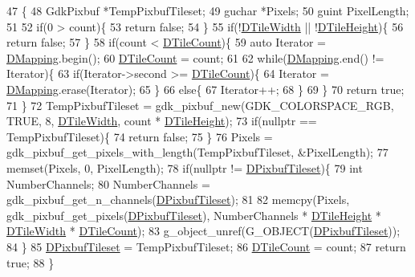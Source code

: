 \begin{DoxyCode}
47                                        \{
48     GdkPixbuf *TempPixbufTileset;
49     guchar *Pixels;
50     guint PixelLength;
51     
52     \textcolor{keywordflow}{if}(0 > count)\{
53         \textcolor{keywordflow}{return} \textcolor{keyword}{false};   
54     \}
55     \textcolor{keywordflow}{if}(!\hyperlink{classCGraphicTileset_a2d0c7d19865b81911a3a43d5cae50e00}{DTileWidth} || !\hyperlink{classCGraphicTileset_af48f32e07d5fe69afd5f764318cc3244}{DTileHeight})\{
56         \textcolor{keywordflow}{return} \textcolor{keyword}{false};
57     \}
58     \textcolor{keywordflow}{if}(count < \hyperlink{classCGraphicTileset_a39d942b370e47f441bf97385eb1037c8}{DTileCount})\{
59         \textcolor{keyword}{auto} Iterator = \hyperlink{classCGraphicTileset_a17cd13f68f77ea4976b59b37b10e914b}{DMapping}.begin();
60         \hyperlink{classCGraphicTileset_a39d942b370e47f441bf97385eb1037c8}{DTileCount} = count;
61         
62         \textcolor{keywordflow}{while}(\hyperlink{classCGraphicTileset_a17cd13f68f77ea4976b59b37b10e914b}{DMapping}.end() != Iterator)\{
63             \textcolor{keywordflow}{if}(Iterator->second >= \hyperlink{classCGraphicTileset_a39d942b370e47f441bf97385eb1037c8}{DTileCount})\{
64                 Iterator = \hyperlink{classCGraphicTileset_a17cd13f68f77ea4976b59b37b10e914b}{DMapping}.erase(Iterator);
65             \}
66             \textcolor{keywordflow}{else}\{
67                 Iterator++;   
68             \}
69         \}
70         \textcolor{keywordflow}{return} \textcolor{keyword}{true};
71     \}
72     TempPixbufTileset = gdk\_pixbuf\_new(GDK\_COLORSPACE\_RGB, TRUE, 8, \hyperlink{classCGraphicTileset_a2d0c7d19865b81911a3a43d5cae50e00}{DTileWidth}, count * 
      \hyperlink{classCGraphicTileset_af48f32e07d5fe69afd5f764318cc3244}{DTileHeight});
73     \textcolor{keywordflow}{if}(\textcolor{keyword}{nullptr} == TempPixbufTileset)\{
74         \textcolor{keywordflow}{return} \textcolor{keyword}{false};   
75     \}
76     Pixels = gdk\_pixbuf\_get\_pixels\_with\_length(TempPixbufTileset, &PixelLength);
77     memset(Pixels, 0, PixelLength);
78     \textcolor{keywordflow}{if}(\textcolor{keyword}{nullptr} != \hyperlink{classCGraphicTileset_a5d5adfcdbb347a6df3f57535ca08e3ef}{DPixbufTileset})\{
79         \textcolor{keywordtype}{int} NumberChannels;
80         NumberChannels = gdk\_pixbuf\_get\_n\_channels(\hyperlink{classCGraphicTileset_a5d5adfcdbb347a6df3f57535ca08e3ef}{DPixbufTileset});
81         
82         memcpy(Pixels, gdk\_pixbuf\_get\_pixels(\hyperlink{classCGraphicTileset_a5d5adfcdbb347a6df3f57535ca08e3ef}{DPixbufTileset}), NumberChannels * 
      \hyperlink{classCGraphicTileset_af48f32e07d5fe69afd5f764318cc3244}{DTileHeight} * \hyperlink{classCGraphicTileset_a2d0c7d19865b81911a3a43d5cae50e00}{DTileWidth} * \hyperlink{classCGraphicTileset_a39d942b370e47f441bf97385eb1037c8}{DTileCount});
83         g\_object\_unref(G\_OBJECT(\hyperlink{classCGraphicTileset_a5d5adfcdbb347a6df3f57535ca08e3ef}{DPixbufTileset}));
84     \}
85     \hyperlink{classCGraphicTileset_a5d5adfcdbb347a6df3f57535ca08e3ef}{DPixbufTileset} = TempPixbufTileset;
86     \hyperlink{classCGraphicTileset_a39d942b370e47f441bf97385eb1037c8}{DTileCount} = count;
87     \textcolor{keywordflow}{return} \textcolor{keyword}{true};
88 \}
\end{DoxyCode}
